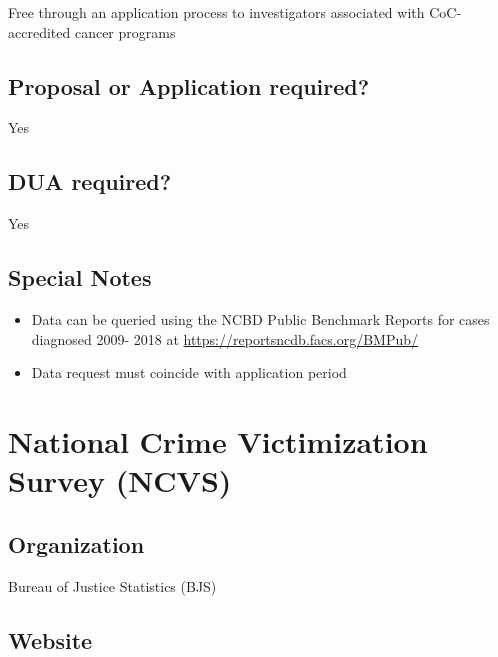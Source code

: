 \documentclass[
]{book}
\providecommand{\tightlist}{%
  \setlength{\itemsep}{0pt}\setlength{\parskip}{0pt}}
\begin{document}
Free through an application process to investigators associated with CoC-accredited cancer programs

\hypertarget{proposal-or-application-required-44}{%
\section{Proposal or Application required?}\label{proposal-or-application-required-44}}

Yes

\hypertarget{dua-required-44}{%
\section{DUA required?}\label{dua-required-44}}

Yes

\hypertarget{special-notes-44}{%
\section{Special Notes}\label{special-notes-44}}

\begin{itemize}
\tightlist
\item
  Data can be queried using the NCBD Public Benchmark Reports for cases diagnosed 2009- 2018 at \url{https://reportsncdb.facs.org/BMPub/}
\item
  Data request must coincide with application period
\end{itemize}

\mainmatter

\hypertarget{national-crime-victimization-survey-ncvs}{%
\chapter{National Crime Victimization Survey (NCVS)}\label{national-crime-victimization-survey-ncvs}}

\hypertarget{organization-45}{%
\section{Organization}\label{organization-45}}

Bureau of Justice Statistics (BJS)

\hypertarget{website-45}{%
\section{Website}\label{website-45}}
\end{document}
